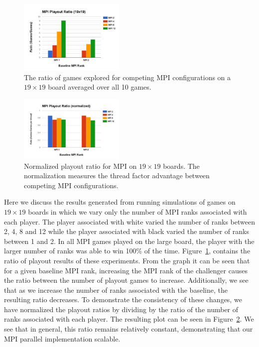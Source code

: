 \documentclass[nocopyrightspace, 10pt]{sigplanconf}
\begin{document}
\begin{figure}
\begin{center}
\includegraphics[width=0.45\textwidth]{MPI_playout_ratio_19x19.pdf}
\end{center}
\caption{The ratio of games explored for competing MPI configurations on a $19 \times 19$ board averaged over all 10 games.}
\label{fig:playoutmpifull}
\end{figure}


\begin{figure}
\begin{center}
\includegraphics[width=0.45\textwidth]{MPI_playout_ratio_norm_19x19.pdf}
\end{center}
\caption{Normalized playout ratio for MPI on $19 \times 19$ boards. The normalization measures the thread factor advantage between competing MPI configurations.}
\label{fig:playoutmpifullnorm}
\end{figure}

Here we discuss the results generated from running simulations of games on $19\times 19$ boards in which we vary only the number of MPI ranks associated with each player. The player associated with white varied the number of ranks between 2, 4, 8 and 12 while the player associated with black varied the number of ranks between 1 and 2.  In all MPI games played on the large board, the player with the larger number of ranks was able to win 100\% of the time.  Figure~\ref{fig:playoutmpifull}, contains the ratio of playout results of these experiments.  From the graph it can be seen that for a given baseline MPI rank, increasing the MPI rank of the challenger causes the ratio between the number of playout games to increase.  Additionally, we see that as we increase the number of ranks associated with the baseline, the resulting ratio decreases.  To demonstrate the consistency of these changes, we have normalized the playout ratios by dividing by the ratio of the number of ranks associated with each player.  The resulting plot can be seen in Figure~\ref{fig:playoutmpifullnorm}.  We see that in general, this ratio remains relatively constant, demonstrating that our MPI parallel implementation scalable.
\end{document}

